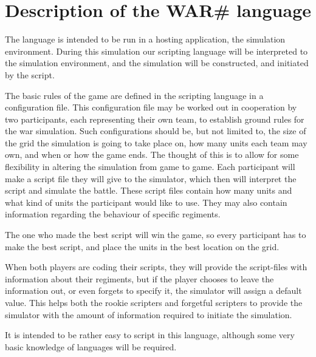 
\section{ Description of the WAR\# language }

	The language is intended to be run in a hosting application, the simulation environment. During this simulation our scripting language will be interpreted to the simulation environment, and the simulation will be constructed, and initiated by the script.
	
	The basic rules of the game are defined in the scripting language in a configuration file. This configuration file may be worked out in cooperation by two participants, each representing their own team, to establish ground rules for the war simulation. Such configurations should be, but not limited to, the size of the grid the simulation is going to take place on, how many units each team may own, and when or how the game ends.
	The thought of this is to allow for some flexibility in altering the simulation from game to game.
	Each participant will make a script file they will give to the simulator, 
	which then will interpret the script and simulate the battle. 
	These script files contain how many units and what kind of units the participant would like to use. They may also contain information regarding the behaviour of specific regiments.

	The one who made the best script will win the game, so every participant has to make the best script, 
	and place the units in the best location on the grid.

When both players are coding their scripts, they will provide the script-files with information about their regiments, but if the player chooses to leave the information out, or even forgets to specify it, the simulator will assign a default value. This helps both the rookie scripters and forgetful scripters to provide the simulator with the amount of information required to initiate the simulation.

It is intended to be rather easy to script in this language, although some very basic knowledge of languages will be required.


